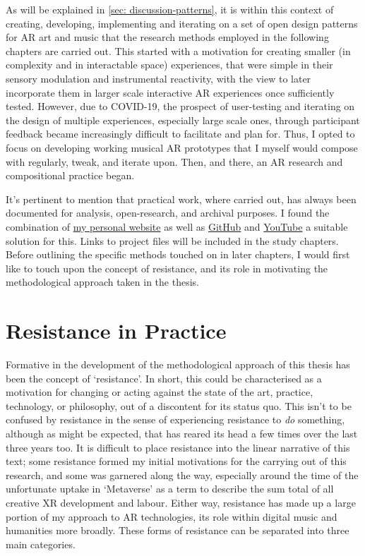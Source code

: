 As will be explained in \autoref{sec: discussion-patterns}, it is within this context of creating, developing, implementing and iterating on a set of open design patterns for AR art and music that the research methods employed in the following chapters are carried out. This started with a motivation for creating smaller (in complexity and in interactable space) experiences, that were simple in their sensory modulation and instrumental reactivity, with the view to later incorporate them in larger scale interactive AR experiences once sufficiently tested. However, due to COVID-19, the prospect of user-testing and iterating on the design of multiple experiences, especially large scale ones, through participant feedback became increasingly difficult to facilitate and plan for. Thus, I opted to focus on developing working musical AR prototypes that I myself would compose with regularly, tweak, and iterate upon. Then, and there, an AR research and compositional practice began.

It's pertinent to mention that practical work, where carried out, has always been documented for analysis, open-research, and archival purposes. I found the combination of \href{https://sambilbow.github.io}{my personal website} as well as \href{https://github.com/sambilbow}{GitHub} and \href{https://youtube.com/@sambilbow}{YouTube} a suitable solution for this. Links to project files will be included in the study chapters. Before outlining the specific methods touched on in later chapters, I would first like to touch upon the concept of resistance, and its role in motivating the methodological approach taken in the thesis.



\section{Resistance in Practice} \label{sec: method-resistance}
Formative in the development of the methodological approach of this thesis has been the concept of `resistance'. In short, this could be characterised as a motivation for changing or acting against the state of the art, practice, technology, or philosophy, out of a discontent for its status quo. This isn't to be confused by resistance in the sense of experiencing resistance to \textit{do} something, although as might be expected, that has reared its head a few times over the last three years too. It is difficult to place resistance into the linear narrative of this text; some resistance formed my initial motivations for the carrying out of this research, and some was garnered along the way, especially around the time of the unfortunate uptake in `Metaverse' as a term to describe the sum total of all creative XR development and labour. Either way, resistance has made up a large portion of my approach to AR technologies, its role within digital music and humanities more broadly. These forms of resistance can be separated into three main categories.

